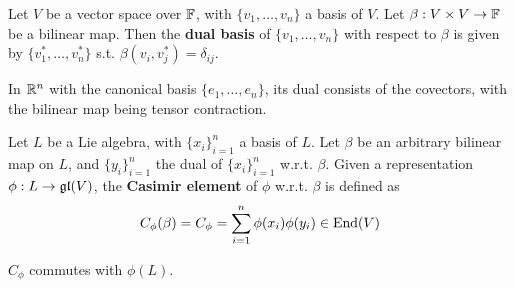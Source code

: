 \documentclass{article}
\begin{document}
\begin{definition}
    Let $V$ be a vector space over $\mathbb{F}$, with $\{ v_1, \dots, v_n \}$ a basis of $V$. Let $\beta: V \times V \to \mathbb{F}$ be a bilinear map. Then the \textbf{dual basis} of $\{ v_1, \dots, v_n \}$ with respect to $\beta$ is given by $\{ v_1^*, \dots, v_n^* \}$ s.t. $\beta(v_i, v_j^*) = \delta_{ij}$.
\end{definition}
\nogap
\begin{remark}
    In $\mathbb{R}^n$ with the canonical basis $\{e_1, \dots, e_n\}$, its dual consists of the covectors, with the bilinear map being tensor contraction.
\end{remark}

\begin{definition}
    Let $L$ be a Lie algebra, with $\{x_i\}_{i = 1}^n$ a basis of $L$. Let $\beta$ be an arbitrary bilinear map on $L$, and $\{y_i\}_{i = 1}^n$ the dual of $\{x_i\}_{i = 1}^n$ w.r.t. $\beta$. Given a representation $\phi: L \to \mathfrak{gl}(V)$, the \textbf{Casimir element} of $\phi$ w.r.t. $\beta$ is defined as
    \[
        C_{\phi}(\beta) = C_{\phi} = \sum_{i = 1}^n \phi(x_i) \phi(y_i) \in \mathrm{End}(V)
    \]
\end{definition}

\begin{lemma}
    $C_{\phi}$ commutes with $\phi(L)$.
\end{lemma}
\end{document}
